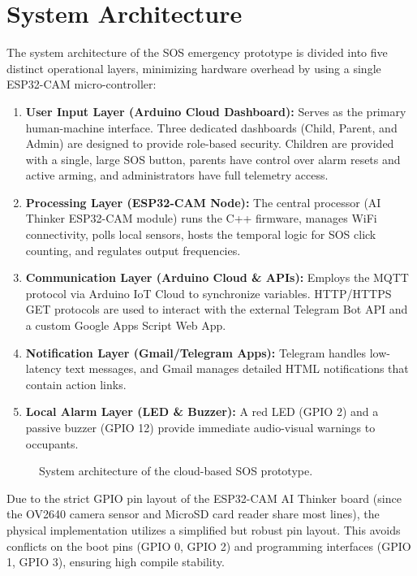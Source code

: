 \documentclass[conference]{IEEEtran}
\begin{document}
\section{System Architecture}
The system architecture of the SOS emergency prototype is divided into five distinct operational layers, minimizing hardware overhead by using a single ESP32-CAM micro-controller:
\begin{enumerate}
    \item \textbf{User Input Layer (Arduino Cloud Dashboard):} Serves as the primary human-machine interface. Three dedicated dashboards (Child, Parent, and Admin) are designed to provide role-based security. Children are provided with a single, large SOS button, parents have control over alarm resets and active arming, and administrators have full telemetry access.
    \item \textbf{Processing Layer (ESP32-CAM Node):} The central processor (AI Thinker ESP32-CAM module) runs the C++ firmware, manages WiFi connectivity, polls local sensors, hosts the temporal logic for SOS click counting, and regulates output frequencies.
    \item \textbf{Communication Layer (Arduino Cloud \& APIs):} Employs the MQTT protocol via Arduino IoT Cloud to synchronize variables. HTTP/HTTPS GET protocols are used to interact with the external Telegram Bot API and a custom Google Apps Script Web App.
    \item \textbf{Notification Layer (Gmail/Telegram Apps):} Telegram handles low-latency text messages, and Gmail manages detailed HTML notifications that contain action links.
    \item \textbf{Local Alarm Layer (LED \& Buzzer):} A red LED (GPIO 2) and a passive buzzer (GPIO 12) provide immediate audio-visual warnings to occupants.
\end{enumerate}

\begin{figure}[!t]
\centering
{}
\caption{System architecture of the cloud-based SOS prototype.}
\label{fig:architecture}
\end{figure}

Due to the strict GPIO pin layout of the ESP32-CAM AI Thinker board (since the OV2640 camera sensor and MicroSD card reader share most lines), the physical implementation utilizes a simplified but robust pin layout. This avoids conflicts on the boot pins (GPIO 0, GPIO 2) and programming interfaces (GPIO 1, GPIO 3), ensuring high compile stability.
\end{document}
